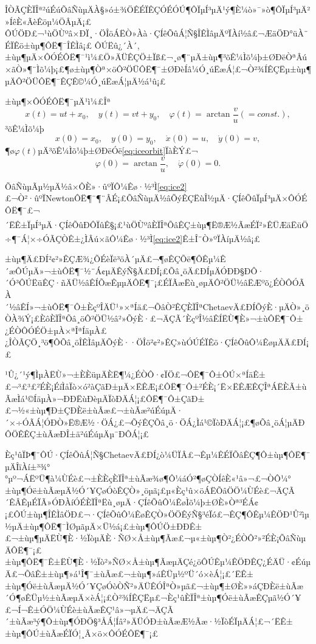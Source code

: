 \documentclass[A4,twoside]{ctexart}
\newcommand{\supercite}[1]{\textsuperscript{\cite{#1}}}
\begin{document}
ÎÒÃÇÈÏÎª²úÉúÕâÑùµÄÀ§»ó±¾ÖÊÉÏÊÇÓÉÓÚ¶ÔÏµÍ³µÄ¹ý¶È¼ò»¯»ò¶ÔÏµÍ³µÄ²»ÍêÈ«ÃèÊöµ¼ÖÂµÄ¡£
ÔÚ\cite{6}ÖÐ£¬¹ùÖÙºâ×ÐÏ¸·ÖÎöÁËÒ»Àà·ÇÍêÕûÁ¦Ñ§ÎÊÌâµÄºÏÀí½â£¬ÆäÖÐ°üÀ¨ÉÏÊö±ùµ¶ÔË¶¯ÎÊÌâ¡£
ÔÚËû¿´À´,±ùµ¶µÄ×ÔÓÉÔË¶¯¹ì¼£Ö»ÄÜÊÇÖ±Ïß£¬¸ø¶¨µÄ±ùµ¶³õÊ¼Ìõ¼þ±ØÐëÒªÂú×ãÒ»¶¨Ìõ¼þ¡£¶ø±ùµ¶Òª×öÔ²ÖÜÔË¶¯±ØÐèÍâ¼Ó¸úËæÁ¦£¬Ò²¾ÍÊÇËµ±ùµ¶µÄÔ²ÖÜÔË¶¯ÊÇÊ©¼Ó¸úËæÁ¦µÄ½á¹û¡£

±ùµ¶×ÔÓÉÔË¶¯µÄ¹ì¼£Îª
\begin{equation}
  \label{eq:iceorbit}
  x(t) = u t +x_0,\quad y(t) = v t + y_0,\quad \varphi (t) = \arctan \frac{v}{u}(= const.),
\end{equation}
³õÊ¼Ìõ¼þ
\begin{equation}
  \label{eq:initial}
  x(0) = x_0,\quad y(0) = y_0,\quad \dot{x}(0) = u,\quad \dot{y}(0) = v,
\end{equation}
¶ø$\varphi(t)$µÄ³õÊ¼Ìõ¼þ±ØÐëÓë\eqref{eq:iceorbit}ÏàÈÝ£¬
\begin{equation}
  \label{eq:initial2}
  \varphi(0) = \arctan \frac{v}{u},\quad \dot{\varphi}(0) = 0.
\end{equation}

ÕâÑùµÃµ½µÄ½â×ÔÈ»·ûºÏÔ¼Êø·½³Ì\eqref{eq:ice2}£¬Ò²·ûºÏNewtonÔË¶¯¶¨ÂÉ¡£ÕâÑùµÄ½âÕýÊÇËùÎ½µÄ·ÇÍêÕûÏµÍ³µÄ×ÔÓÉÔË¶¯£¬´ËÊ±ÏµÍ³µÄ·ÇÍêÕûÐÔÏûÊ§\supercite{8}¡£¹ùÖÙºâÈÏÎªÕâÊÇ±ùµ¶Ë®Æ½ÃæÉÏ²»ÊÜÆäËüÖ÷¶¯Á¦×÷ÓÃÇÒÊ±¿ÌÂú×ãÔ¼Êø·½³Ì\eqref{eq:ice2}Ê±Î¨Ò»ºÏÀíµÄ½â\supercite{6}¡£

±ùµ¶Ä£ÐÍ²¢²»ÊÇÆ¾¿ÕÉèÏë³öÀ´µÄ£¬¶øÊÇÕë¶ÔÊµ¼Ê´æÔÚµÄ»¬±ùÔË¶¯½¨Á¢µÄÊýÑ§Ä£ÐÍ¡£Õâ¸öÄ£ÐÍµÄÓÐÐ§ÐÔ·´Ó³ÔÚËüÊÇ·ñÄÜ½âÊÍÕæÊµµÄÔË¶¯¡£ÉÏÃæËù¸øµÄÔ²ÖÜ½âËÆºõ¿ÉÒÔÓÃÀ´½âÊÍ»¬±ùÔË¶¯Ô±ÈçºÎÄÜ¹»×ªÍä£¬ÕâÒ²ÊÇÈÏÎªChetaevÄ£ÐÍÕýÈ·µÄÒ»¸öÒÀ¾Ý¡£ÈôÈÏÎªÕâ¸öÔ²ÖÜ½â²»ÕýÈ·£¬ÄÇÃ´ÈçºÎ½âÊÍËÙ¶È»¬±ùÔË¶¯Ô±¿ÉÒÔÓÉÖ±µÀ×ªÎªÍäµÀ£¿ÎÒÃÇÖ¸³ö¶ÔÕâ¸öÎÊÌâµÄÕýÈ··ÖÎö²¢²»ÊÇ»ùÓÚÉÏÊö·ÇÍêÕûÔ¼ÊøµÄÄ£ÐÍ¡£

¹Û¿´¹ý¶ÌµÀËÙ»¬±ÈÈüµÄÈË¶¼¿ÉÒÔ·¢ÏÖ£¬ÔË¶¯Ô±ÔÚ×ªÍäÊ±£¬³£³£²ÉÈ¡ÉíÌåÏò×ó²àÇãÐ±µÄ×ËÊÆ¡£ÔË¶¯Ô±²ÉÈ¡´Ë×ËÊÆÊÇÎªÁËÈÃ±ùÃæÌá¹©ÍäµÀ»¬ÐÐËùÐèµÄÏòÐÄÁ¦¡£ÔË¶¯Ô±ÇãÐ±£¬½«±ùµ¶Ð±ÇÐÈë±ùÃæ£¬±ùÃæ²úÉúµÄ·´×÷ÓÃÁ¦ÓÐÒ»Ë®Æ½·ÖÁ¿£¬ÕýÊÇÕâ¸ö·ÖÁ¿Ìá¹©ÏòÐÄÁ¦¡£¶øÕâ¸öÁ¦µÄÐÔÖÊÊÇ±ùÃæÐÎ±ä²úÉúµÄµ¯ÐÔÁ¦¡£

Èç¹ûÏÞ¶¨ÔÚ·ÇÍêÕûÁ¦Ñ§ChetaevÄ£ÐÍ¿ò¼ÜÏÂ£¬Êµ¼ÊÉÏÕâÊÇ¶Ô±ùµ¶ÔË¶¯µÄÎïÀí±³¾°°µº¬ÁËºÜ¶à¼ÙÉè£¬±ÈÈçÈÏÎª±ùÃæ¾ø¶Ô¼áÓ²¶øÇÒÍêÈ«¹â»¬£¬ÒÔ¼°±ùµ¶Óë±ùÃæµÄ½Ó´¥ÇøÓòÊÇÒ»¸öµã¡£µ«Èç¹û×öÁËÕâÖÖ¼ÙÉè£¬ÄÇÃ´ÊÂÊµÉÏÃ»ÓÐÀíÓÉÈÏÎªËù¸øµÄ·ÇÍêÕûÔ¼ÊøÌõ¼þ±ØÈ»Òª³ÉÁ¢¡£ÔÚ±ùµ¶ÎÊÌâÖÐ£¬·ÇÍêÕûÔ¼ÊøÊÇÒ»ÖÖÊýÑ§³éÏó£¬ÊÇ¶ÔÊµ¼ÊÖÐ¹Û²ìµ½µÄ±ùµ¶ÔË¶¯ÌØµãµÄ×Ü½á¡£±ùµ¶ÔÚÖ±ÐÐÊ±£¬±ùµ¶µÄËÙ¶È·½ÏòµÄÈ·ÑØ×Å±ùµ¶Ãæ£¬µ«±ùµ¶Ò²¿ÉÒÔ²»²ÉÈ¡ÕâÑùµÄÔË¶¯¡£±ùµ¶ÔË¶¯Ê±ËÙ¶È·½Ïò²»ÑØ×Å±ùµ¶ÃæµÄÇé¿öÔÚÊµ¼ÊÖÐÊÇ¿ÉÄÜ·¢ÉúµÄ£¬ÕâÊ±±ùµ¶»á¹Î¶¯±ùÃæ£¬±ùµ¶»áÊÜµ½ºÜ´ó×èÁ¦¡£´ËÊ±±ùµ¶Óë±ùÃæµÄ½Ó´¥ÇøÓòÒÑ²»ÄÜÊÓÎªÒ»µã£¬±ùµ¶±ØÈ»»áÇÐÈë±ùÃæ´Ó¶øÊÜµ½±ùÃæµÄ×èÁ¦¡£Ò²¾ÍÊÇËµ£¬Èç¹ûÈÏÎª±ùµ¶Óë±ùÃæÊÇµã½Ó´¥£¬Í¬Ê±ÓÖ¼ÙÉè±ùÃæÊÇ¹â»¬µÄ£¬ÄÇÃ´±ùÃæ³ý¶Ô±ùµ¶ÓÐÖ§³ÅÁ¦Íâ²»ÄÜÓÐ±ùÃæÆ½Ãæ·½ÏòÉÏµÄÁ¦£¬´ËÊ±±ùµ¶ÔÚ±ùÃæÉÏÓ¦¸Ã×ö×ÔÓÉÔË¶¯¡£
\end{document}
